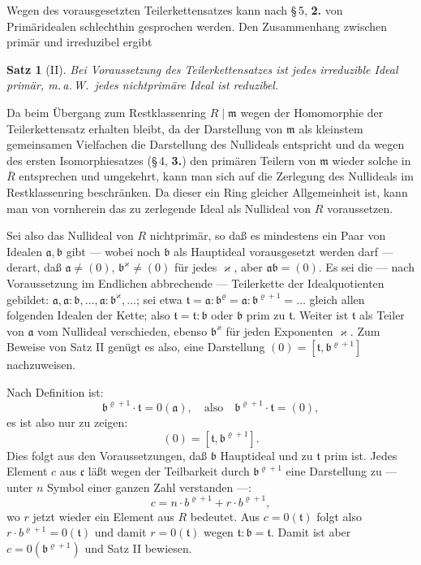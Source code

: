 \documentclass[12pt,a4paper]{article}
\theoremstyle{plain}
\newtheorem{Satz}{Satz}[section]
\theoremstyle{definition}
\theoremstyle{remark}
\begin{document}
Wegen des vorausgesetzten Teilerkettensatzes kann nach \S\,5, \textbf{2.} von Primäridealen schlechthin gesprochen werden. Den Zusammenhang zwischen primär und irreduzibel ergibt

\begin{Satz}[II]
Bei Voraussetzung des Teilerkettensatzes ist jedes irreduzible Ideal primär, m.\,a.\,W.\ jedes nichtprimäre Ideal ist reduzibel.
\end{Satz}

Da beim Übergang zum Restklassenring $R \mid \mathfrak{m}$ wegen der Homomorphie der Teilerkettensatz erhalten bleibt, da der Darstellung von $\mathfrak{m}$ als kleinstem gemeinsamen Vielfachen die Darstellung des Nullideals entspricht und da wegen des ersten Isomorphiesatzes (\S\,4, \textbf{3.}) den primären Teilern von $\mathfrak{m}$ wieder solche in $\bar{R}$ entsprechen und umgekehrt, kann man sich auf die Zerlegung des Nullideals im Restklassenring beschränken. Da dieser ein Ring gleicher Allgemeinheit ist, kann man von vornherein das zu zerlegende Ideal als Nullideal von $R$ voraussetzen.

Sei also das Nullideal von $R$ nichtprimär, so daß es mindestens ein Paar von Idealen $\mathfrak{a}, \mathfrak{b}$ gibt --- wobei noch $\mathfrak{b}$ als Hauptideal vorausgesetzt werden darf --- derart, daß $\mathfrak{a} \neq (0)$, $\mathfrak{b}^{\varkappa} \neq (0)$ für jedes $\varkappa$, aber $\mathfrak{a}\mathfrak{b} = (0)$. Es sei die --- nach Voraussetzung im Endlichen abbrechende --- Teilerkette der Idealquotienten gebildet: $\mathfrak{a}, \mathfrak{a}:\mathfrak{b},\dots, \mathfrak{a}:\mathfrak{b}^{\varkappa},\dots$; sei etwa $\mathfrak{t} = \mathfrak{a}:\mathfrak{b}^{\varrho} = \mathfrak{a}:\mathfrak{b}^{\varrho+1} = \dots$ gleich allen folgenden Idealen der Kette; also $\mathfrak{t} = \mathfrak{t}:\mathfrak{b}$ oder $\mathfrak{b}$ prim zu $\mathfrak{t}$. Weiter ist $\mathfrak{t}$ als Teiler von $\mathfrak{a}$ vom Nullideal verschieden, ebenso $\mathfrak{b}^{\varkappa}$ für jeden Exponenten $\varkappa$. Zum Beweise von Satz II genügt es also, eine Darstellung $(0) = [\mathfrak{t}, \mathfrak{b}^{\varrho+1}]$ nachzuweisen.

Nach Definition ist:
\[
\mathfrak{b}^{\varrho+1} \cdot \mathfrak{t} = 0(\mathfrak{a}), \quad \text{also} \quad \mathfrak{b}^{\varrho+1} \cdot \mathfrak{t} = (0),
\]
es ist also nur zu zeigen:
\[
(0) = [\mathfrak{t}, \mathfrak{b}^{\varrho+1}].
\]
Dies folgt aus den Voraussetzungen, daß $\mathfrak{b}$ Hauptideal und zu $\mathfrak{t}$ prim ist. Jedes Element $c$ aus $\mathfrak{c}$ läßt wegen der Teilbarkeit durch $\mathfrak{b}^{\varrho+1}$ eine Darstellung zu --- unter $n$ Symbol einer ganzen Zahl verstanden ---:
\[
c = n \cdot b^{\varrho+1} + r \cdot b^{\varrho+1},
\]
wo $r$ jetzt wieder ein Element aus $R$ bedeutet. Aus $c = 0(\mathfrak{t})$ folgt also $r \cdot b^{\varrho+1} = 0(\mathfrak{t})$ und damit $r = 0(\mathfrak{t})$ wegen $\mathfrak{t}:\mathfrak{b} = \mathfrak{t}$. Damit ist aber $c = 0(\mathfrak{b}^{\varrho+1})$ und Satz II bewiesen.
\end{document}
